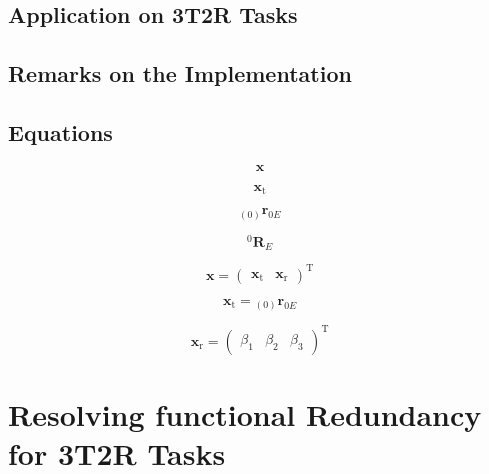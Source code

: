\documentclass[twocolumn,10pt]{IFTOMM}
\newcommand{\bm}[1]{\boldsymbol{#1}}
\newcommand{\ortvek}[4]{{ }_{(#1)}{\boldsymbol{#2}}^{#3}_{#4} }
\newcommand{\rotmat}[2]{{{ }^{#1}\boldsymbol{R}}_{#2}}
\newcommand{\transp}[0]{{\mathrm{T}}}
\begin{document}
\subsection{Application on 3T2R Tasks}

\subsection{Remarks on the Implementation}

\subsection{Equations}


\begin{equation}
\bm{x}
\end{equation} 

\begin{equation}
\bm{x}_{\mathrm{t}}
\end{equation} 


\begin{equation}
\ortvek{0}{r}{}{0E}
\end{equation} 

\begin{equation}
\rotmat{0}{E}
\end{equation} 

\begin{equation}
\bm{x}
=
\begin{pmatrix}
\bm{x}_{\mathrm{t}} & \bm{x}_{\mathrm{r}}
\end{pmatrix}^\transp
\end{equation}  

\begin{equation}
\bm{x}_{\mathrm{t}}
=
\ortvek{0}{r}{}{0E}
\end{equation}  

\begin{equation}
\bm{x}_{\mathrm{r}}
=
\begin{pmatrix}
\beta_1  & \beta_2 & \beta_3
\end{pmatrix}^{\mathrm{T}}
\end{equation}


\section{Resolving functional Redundancy for 3T2R Tasks}
\label{sec:ResFuncRed}
\end{document}

